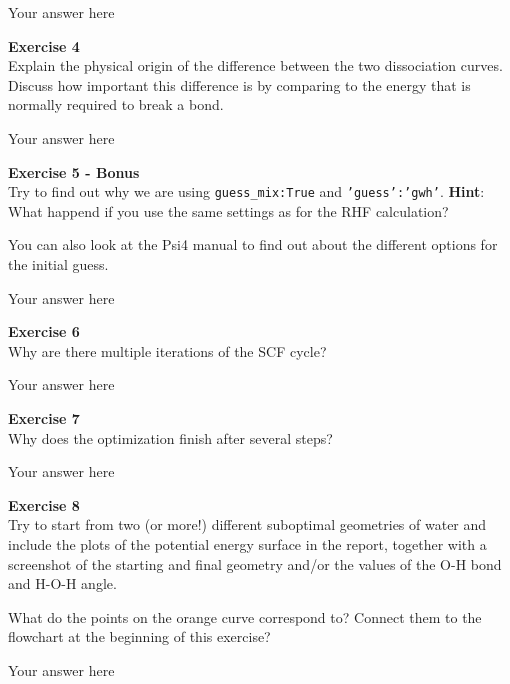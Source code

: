 \documentclass{article}
\begin{document}
Your answer here

\begin{mdframed}
\textbf{Exercise 4}\\
Explain the physical origin of the difference between the two
dissociation curves. Discuss how important this difference is by
comparing to the energy that is normally required to break a bond.
\end{mdframed}

Your answer here

\begin{mdframed}
\textbf{Exercise 5 - Bonus}\\
Try to find out why we are using \texttt{guess\_mix:True} and \texttt{'guess':'gwh'}. \textbf{Hint}: What happend if you use the same settings as for the RHF calculation?

You can also look at the Psi4 manual to find out about the different options for the initial guess.
\end{mdframed}

Your answer here

\begin{mdframed}
\textbf{Exercise 6}\\
Why are there multiple iterations of the SCF cycle?
\end{mdframed}

Your answer here

\begin{mdframed}
\textbf{Exercise 7}\\
Why does the optimization finish after several steps?
\end{mdframed}

Your answer here

\begin{mdframed}
\textbf{Exercise 8}\\
Try to start from two (or more!) different suboptimal geometries of water and include the plots of the potential energy surface in the report, together with a screenshot of the starting and final geometry and/or the values of the O-H bond and H-O-H angle.

What do the points on the orange curve correspond to? Connect them to the flowchart at the beginning of this exercise?
\end{mdframed}

Your answer here
\end{document}

